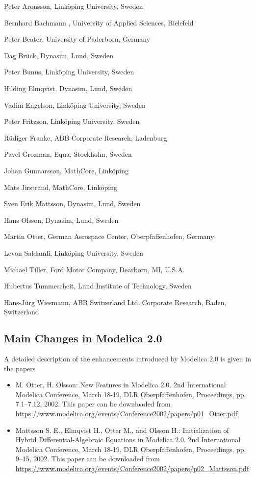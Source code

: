 \indent\indent
Peter Aronsson, Linköping University, Sweden

Bernhard Bachmann , University of Applied Sciences, Bielefeld

Peter Beater, University of Paderborn, Germany

Dag Brück, Dynasim, Lund, Sweden

Peter Bunus, Linköping University, Sweden

Hilding Elmqvist, Dynasim, Lund, Sweden

Vadim Engelson, Linköping University, Sweden

Peter Fritzson, Linköping University, Sweden

Rüdiger Franke, ABB Corporate Research, Ladenburg

Pavel Grozman, Equa, Stockholm, Sweden

Johan Gunnarsson, MathCore, Linköping

Mats Jirstrand, MathCore, Linköping

Sven Erik Mattsson, Dynasim, Lund, Sweden

Hans Olsson, Dynasim, Lund, Sweden

Martin Otter, German Aerospace Center, Oberpfaffenhofen, Germany

Levon Saldamli, Linköping University, Sweden

Michael Tiller, Ford Motor Company, Dearborn, MI, U.S.A.

Hubertus Tummescheit, Lund Institute of Technology, Sweden

Hans-Jürg Wiesmann, ABB Switzerland Ltd.,Corporate Research, Baden,
Switzerland

\subsection{Main Changes in Modelica 2.0}\label{main-changes-in-modelica-2-0}

A detailed description of the enhancements introduced by Modelica 2.0 is
given in the papers
\begin{itemize}
\item
  M. Otter, H. Olsson: New Features in Modelica 2.0. 2nd International
  Modelica Conference, March 18-19, DLR Oberpfaffenhofen, Proceedings,
  pp. 7.1--7.12, 2002. This paper can be downloaded from
  \url{https://www.modelica.org/events/Conference2002/papers/p01_Otter.pdf}
\item
  Mattsson S. E., Elmqvist H., Otter M., and Olsson H.: Initialization
  of Hybrid Differential-Algebraic Equations in Modelica 2.0. 2nd
  International Modelica Conference, March 18-19, DLR Oberpfaffenhofen,
  Proceedings, pp. 9--15, 2002. This paper can be downloaded from
  \url{https://www.modelica.org/events/Conference2002/papers/p02_Mattsson.pdf}
\end{itemize}

